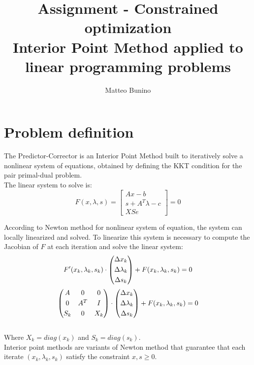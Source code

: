\documentclass[]{article}
\title{Assignment - Constrained optimization\\Interior Point Method applied to linear programming
	problems}
\author{Matteo Bunino}
\begin{document}
\maketitle

\section{Problem definition}
The Predictor-Corrector is an Interior Point Method built to iteratively solve a nonlinear system of equations, obtained by defining the KKT condition for the pair primal-dual problem.\\
The linear system to solve is:
\begin{equation*}
	F(x,\lambda, s) = 
	\begin{bmatrix}
	Ax-b \\[0.3em]
	s+A^T\lambda-c \\[0.3em]
	XSe          
	\end{bmatrix}
	=0
\end{equation*}

According to Newton method for nonlinear system of equation, the system can locally linearized and solved. To linearize this system is necessary to compute the Jacobian of $F$ at each iteration and solve the linear system:
\begin{equation*}
	F'(x_k,\lambda_k, s_k) \cdot 
	\begin{pmatrix}
	\Delta x_k \\[0.3em]
	\Delta \lambda_k \\[0.3em]
	\Delta s_k           
	\end{pmatrix}
	+ F(x_k,\lambda_k, s_k)=0\\
\end{equation*}
\begin{equation*}
\begin{pmatrix}
A & 0 & 0 \\[0.3em]
0 & A^T & I \\[0.3em]
S_k & 0 & X_k           
\end{pmatrix}
\cdot 
\begin{pmatrix}
\Delta x_k \\[0.3em]
\Delta \lambda_k \\[0.3em]
\Delta s_k           
\end{pmatrix}
+ F(x_k,\lambda_k, s_k)=0\\
\end{equation*}
\\
Where $X_k=diag(x_k)$ and $S_k=diag(s_k)$.\\
Interior point methods are variants of Newton method that guarantee that each iterate $(x_k, \lambda_k, s_k)$ satisfy the constraint $x, s\geq0$.
\pagebreak
\end{document}
